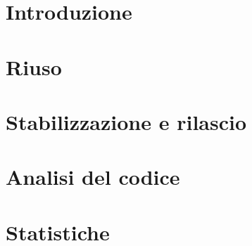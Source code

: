
\section{Introduzione}

\section{Riuso}

\section{Stabilizzazione e rilascio}

\section{Analisi del codice}

\section{Statistiche}

